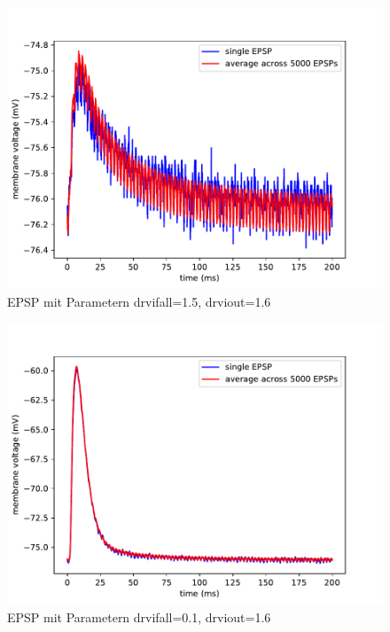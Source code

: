 \documentclass[10pt,a4paper]{scrartcl}
\begin{document}
\begin{figure} [ht]
\begin{center}
\label{fig:abb06}
\caption{EPSP mit Parametern drvifall=1.5, drviout=1.6}
\includegraphics[scale=0.35]{pictures/epsp_fall_1_5_out_1_6.pdf} 
\end{center}
\end{figure}

\begin{figure} [ht]
\begin{center}
\label{fig:abb07}
\caption{EPSP mit Parametern drvifall=0.1, drviout=1.6}
\includegraphics[scale=0.35]{pictures/epsp_fall_0_1_out_1_6.pdf} 
\end{center}
\end{figure}
\end{document}
